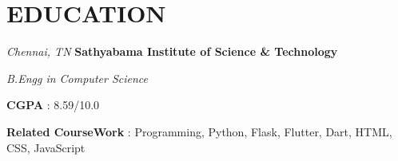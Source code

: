 \section{EDUCATION}
\begin{twocolentry}{
    \textit{Chennai, TN}}
    \textbf{Sathyabama Institute of Science \& Technology}

    \textit{B.Engg in Computer Science}
\end{twocolentry}
    
\vspace{0.10 cm}

\begin{onecolentry}
    \textbf{CGPA} : 8.59/10.0
\end{onecolentry}

\vspace{0.10 cm}

\begin{onecolentry}
    \textbf{Related CourseWork} : Programming, Python, Flask, Flutter, Dart, HTML, CSS, JavaScript
\end{onecolentry}


